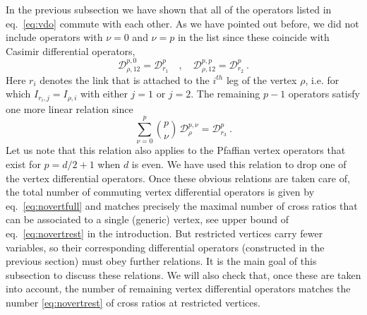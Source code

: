 \documentclass{article}
\begin{document}
In the previous subsection we have shown that all of the operators listed in 
eq.\ \eqref{eq:vdo} commute with each other. As we have pointed out before, we 
did not include operators with $\nu =0$ and $\nu =p$ in the list since these 
coincide with Casimir differential operators,  
\begin{equation}
\mathcal{D}^{p,0}_{\rho,12} = \mathcal{D}^p_{r_1} \quad , \quad 
\mathcal{D}^{p,p}_{\rho,12} = \mathcal{D}^p_{r_2}\ . 
\end{equation} 
Here $r_i$ denotes the link that is attached to the $i^{th}$ leg of the 
vertex $\rho$, i.e. for which $I_{r_i,j} = I_{\rho,i}$ with either $j=1$ 
or $j=2$. The remaining $p-1$ operators satisfy one more linear relation 
since 
\begin{equation} 
\sum_{\nu= 0}^p \binom{p}{\nu} \, \mathcal{D}^{p,\nu}_\rho = \mathcal{D}^p_{r_3} \ . 
\end{equation} 
Let us note that this relation also applies to the Pfaffian vertex operators 
that exist for $p=d/2+1$ when $d$ is even. We have used this relation to drop 
one of the vertex differential operators. Once these obvious relations are 
taken care of, the total number of commuting vertex differential operators 
is given by eq.\ \eqref{eq:novertfull} and matches precisely the maximal 
number of cross ratios that can be associated to a single (generic) vertex, 
see upper bound of eq.\ \eqref{eq:novertrest} in the introduction. But restricted vertices carry fewer variables, so their corresponding differential operators (constructed in the previous section) must obey further relations. It is the main goal of this subsection to discuss these 
relations. We will also check that, once these are taken into account, the 
number of remaining vertex differential operators matches the number 
\eqref{eq:novertrest} of cross ratios at restricted vertices. 
\medskip 
\end{document}
